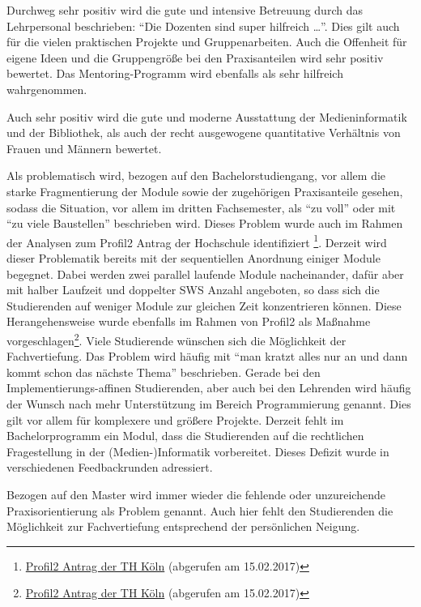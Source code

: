 Durchweg sehr positiv wird die gute und intensive Betreuung durch das
Lehrpersonal beschrieben: ``Die Dozenten sind super hilfreich
\ldots{}''. Dies gilt auch für die vielen praktischen Projekte und
Gruppenarbeiten. Auch die Offenheit für eigene Ideen und die
Gruppengröße bei den Praxisanteilen wird sehr positiv bewertet. Das
Mentoring-Programm wird ebenfalls als sehr hilfreich wahrgenommen.

Auch sehr positiv wird die gute und moderne Ausstattung der
Medieninformatik und der Bibliothek, als auch der recht ausgewogene
quantitative Verhältnis von Frauen und Männern bewertet.

Als problematisch wird, bezogen auf den Bachelorstudiengang, vor allem
die starke Fragmentierung der Module sowie der zugehörigen Praxisanteile
gesehen, sodass die Situation, vor allem im dritten Fachsemester, als
``zu voll'' oder mit ``zu viele Baustellen'' beschrieben wird. Dieses
Problem wurde auch im Rahmen der Analysen zum Profil2 Antrag der
Hochschule identifiziert \footnote{\href{https://www.th-koeln.de/mam/downloads/deutsch/hochschule/profil/lehre/profil2_antrag_ministerium.pdf}{Profil2
  Antrag der TH Köln} (abgerufen am 15.02.2017)}. Derzeit wird dieser
Problematik bereits mit der sequentiellen Anordnung einiger Module
begegnet. Dabei werden zwei parallel laufende Module nacheinander, dafür
aber mit halber Laufzeit und doppelter SWS Anzahl angeboten, so dass
sich die Studierenden auf weniger Module zur gleichen Zeit konzentrieren
können. Diese Herangehensweise wurde ebenfalls im Rahmen von Profil2 als
Maßnahme vorgeschlagen\footnote{\href{https://www.th-koeln.de/mam/downloads/deutsch/hochschule/profil/lehre/profil2_antrag_ministerium.pdf}{Profil2
  Antrag der TH Köln} (abgerufen am 15.02.2017)}. Viele Studierende
wünschen sich die Möglichkeit der Fachvertiefung. Das Problem wird
häufig mit ``man kratzt alles nur an und dann kommt schon das nächste
Thema'' beschrieben. Gerade bei den Implementierungs-affinen
Studierenden, aber auch bei den Lehrenden wird häufig der Wunsch nach
mehr Unterstützung im Bereich Programmierung genannt. Dies gilt vor
allem für komplexere und größere Projekte. Derzeit fehlt im
Bachelorprogramm ein Modul, dass die Studierenden auf die rechtlichen
Fragestellung in der (Medien-)Informatik vorbereitet. Dieses Defizit
wurde in verschiedenen Feedbackrunden adressiert.

Bezogen auf den Master wird immer wieder die fehlende oder unzureichende
Praxisorientierung als Problem genannt. Auch hier fehlt den Studierenden
die Möglichkeit zur Fachvertiefung entsprechend der persönlichen
Neigung.

